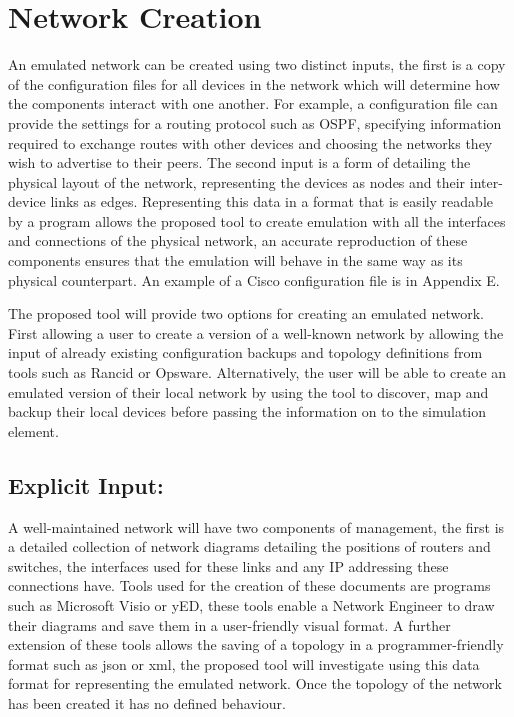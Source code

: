 \documentclass[11pt]{report}
\begin{document}
\section{Network Creation}

An emulated network can be created using two distinct inputs, the first is a copy of the configuration files for all devices in the network which will determine how the components interact with one another. For example, a configuration file can provide the settings for a routing protocol such as OSPF, specifying information required to exchange routes with other devices and choosing the networks they wish to advertise to their peers. The second input is a form of detailing the physical layout of the network, representing the devices as nodes and their inter-device links as edges. Representing this data in a format that is easily readable by a program allows the proposed tool to create emulation with all the interfaces and connections of the physical network, an accurate reproduction of these components ensures that the emulation will behave in the same way as its physical counterpart. An example of a Cisco configuration file is in Appendix E.

The proposed tool will provide two options for creating an emulated network. First allowing a user to create a version of a well-known network by allowing the input of already existing configuration backups and topology definitions from tools such as Rancid or Opsware. Alternatively, the user will be able to create an emulated version of their local network by using the tool to discover, map and backup their local devices before passing the information on to the simulation element.

\subsection{Explicit Input:}

A well-maintained network will have two components of management, the first is a detailed collection of network diagrams detailing the positions of routers and switches, the interfaces used for these links and any IP addressing these connections have. Tools used for the creation of these documents are programs such as Microsoft Visio or yED, these tools enable a Network Engineer to draw their diagrams and save them in a user-friendly visual format. A further extension of these tools allows the saving of a topology in a programmer-friendly format such as json or xml, the proposed tool will investigate using this data format for representing the emulated network. Once the topology of the network has been created it has no defined behaviour.
\end{document}
